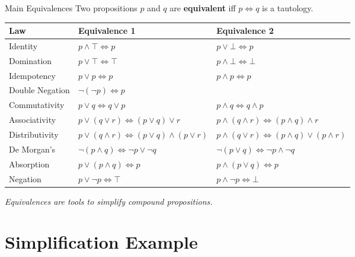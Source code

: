 \documentclass[aspectratio=169]{beamer}
\newcommand{\Iff}{\Leftrightarrow}
\newcommand{\T}{\top}
\newcommand{\F}{\bot}
\begin{document}
\begin{frame}{Main Equivalences}
  Two propositions $p$ and $q$ are \textbf{equivalent} iff
  $p \Iff q$ is a tautology.

  \medskip
  \footnotesize
  \renewcommand{\arraystretch}{1.25}
  \begin{tabular}{lll}
    \toprule
    \textbf{Law} & \textbf{Equivalence 1} & \textbf{Equivalence 2} \\
    \midrule
    Identity        & $p \land \T \Iff p$
                    & $p \lor  \F \Iff p$ \\
    Domination      & $p \lor  \T \Iff \T$
                    & $p \land \F \Iff \F$ \\
    Idempotency     & $p \lor  p \Iff p$
                    & $p \land p \Iff p$ \\
    Double Negation & $\lnot(\lnot p) \Iff p$
                    & \\
    Commutativity   & $p \lor  q \Iff q \lor  p$
                    & $p \land q \Iff q \land p$ \\
    Associativity   & $p \lor (q \lor  r) \Iff (p \lor  q) \lor  r$
                    & $p \land(q \land r) \Iff (p \land q) \land r$ \\
    Distributivity  & $p \lor (q \land r) \Iff (p \lor  q)\land(p \lor  r)$
                    & $p \land(q \lor  r) \Iff (p \land q)\lor (p \land r)$ \\
    De Morgan's     & $\lnot(p \land q) \Iff \lnot p \lor  \lnot q$
                    & $\lnot(p \lor  q) \Iff \lnot p \land \lnot q$ \\
    Absorption      & $p \lor (p \land q) \Iff p$
                    & $p \land(p \lor  q) \Iff p$ \\
    Negation        & $p \lor \lnot p \Iff \T$
                    & $p \land \lnot p \Iff \F$ \\
    \bottomrule
  \end{tabular}
  \normalsize

  \medskip
  \textit{Equivalences are tools to simplify compound propositions.}
\end{frame}

\section{Simplification Example}
\end{document}
